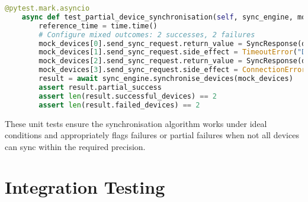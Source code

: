 \documentclass[11pt,a4paper]{report}
\begin{document}
\begin{lstlisting}[language=Python]
    @pytest.mark.asyncio  
    async def test_partial_device_synchronisation(self, sync_engine, mock_devices):  
        reference_time = time.time()  
        # Configure mixed outcomes: 2 successes, 2 failures  
        mock_devices[0].send_sync_request.return_value = SyncResponse(device_timestamp=reference_time, response_time=time.time()+0.01)  
        mock_devices[1].send_sync_request.side_effect = TimeoutError("Device unreachable")  
        mock_devices[2].send_sync_request.return_value = SyncResponse(device_timestamp=reference_time+0.001, response_time=time.time()+0.015)  
        mock_devices[3].send_sync_request.side_effect = ConnectionError("Network error")  
        result = await sync_engine.synchronise_devices(mock_devices)  
        assert result.partial_success  
        assert len(result.successful_devices) == 2  
        assert len(result.failed_devices) == 2  
\end{lstlisting}
These unit tests ensure the synchronisation algorithm works under ideal conditions and appropriately flags failures or partial failures when not all devices can sync within the required precision.
\section{Integration Testing}
\end{document}
